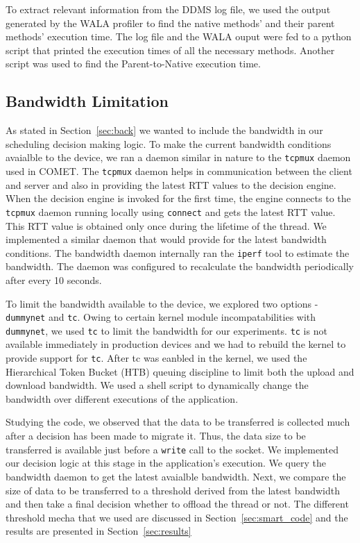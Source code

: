 To extract relevant information from the DDMS log file, we used the output generated by the WALA profiler to find the native methods' and their
parent methods' execution time. The log file and the WALA ouput were fed to a python script that printed the execution times of all the
necessary methods. Another script was used to find the Parent-to-Native execution time.

\subsection{Bandwidth Limitation}
As stated in Section~\ref{sec:back} we wanted to include the bandwidth in our scheduling decision making logic. To make the current bandwidth conditions avaialble to the device, we ran a daemon similar in nature to the \texttt{tcpmux} daemon used in COMET. The \texttt{tcpmux} daemon helps in communication between the client and server and also in providing the latest RTT values to the decision engine. When the decision engine is invoked for the first time, the engine connects to the \texttt{tcpmux} daemon running locally using \texttt{connect} and gets the latest RTT value. This RTT value is obtained only once during the lifetime of the thread. We implemented a similar daemon that would provide for the latest bandwidth conditions. The bandwidth daemon internally ran the \texttt{iperf} tool to estimate the bandwidth. The daemon was configured to recalculate the bandwidth periodically after every 10 seconds.

To limit the bandwidth available to the device, we explored two options - \texttt{dummynet} and \texttt{tc}. Owing to certain kernel module incompatabilities with \texttt{dummynet}, we used \texttt{tc} to limit the bandwidth for our experiments. \texttt{tc} is not available immediately in production devices and we had to rebuild the kernel to provide support for \texttt{tc}. After tc was eanbled in the kernel, we used the Hierarchical Token Bucket (HTB) queuing discipline to limit both the upload and download bandwidth. We used a shell script to dynamically change the bandwidth over different executions of the application.

Studying the code, we observed that the data to be transferred is collected much after a decision has been made to migrate it. Thus, the data size to be transferred is available just before a \texttt{write} call to the socket. We implemented our decision logic at this stage in the application's execution. We query the bandwidth daemon to get the latest avaialble bandwidth. Next, we compare the size of data to be transferred to a threshold derived from the latest bandwidth and then take a final decision whether to offload the thread or not. The different threshold mecha that we used are discussed in Section~\ref{sec:smart_code} and the results are presented in Section~\ref{sec:results}

